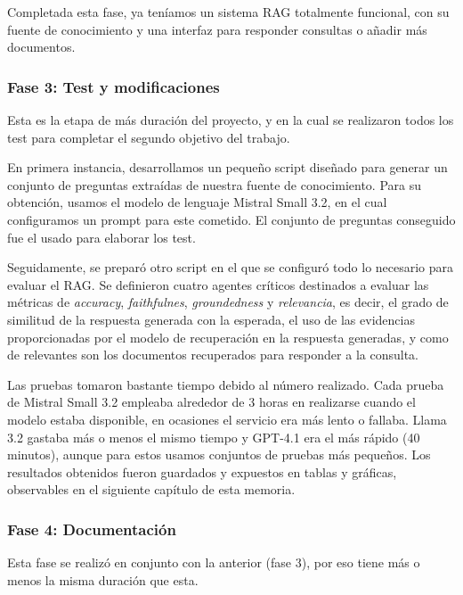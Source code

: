         		\noindent Completada esta fase, ya teníamos un sistema RAG totalmente funcional, con su fuente de conocimiento y una interfaz para responder consultas o añadir más documentos.
        		
        	\subsubsection{Fase 3: Test y modificaciones}
        	
        		Esta es la etapa de más duración del proyecto, y en la cual se realizaron todos los test para completar el segundo objetivo del trabajo.
        		
        		\noindent En primera instancia, desarrollamos un pequeño script diseñado para generar un conjunto de preguntas extraídas de nuestra fuente de conocimiento. Para su obtención, usamos el modelo de lenguaje Mistral Small 3.2, en el cual configuramos un prompt para este cometido. El conjunto de preguntas conseguido fue el usado para elaborar los test.
        		
        		\noindent Seguidamente, se preparó otro script en el que se configuró todo lo necesario para evaluar el RAG. Se definieron cuatro agentes críticos destinados a evaluar las métricas de \textit{accuracy}, \textit{faithfulnes}, \textit{groundedness} y \textit{relevancia}, es decir, el grado de similitud de la respuesta generada con la esperada, el uso de las evidencias proporcionadas por el modelo de recuperación en la respuesta generadas, y como de relevantes son los documentos recuperados para responder a la consulta.
        		
        		\noindent Las pruebas tomaron bastante tiempo debido al número realizado. Cada prueba de Mistral Small 3.2 empleaba alrededor de 3 horas en realizarse cuando el modelo estaba disponible, en ocasiones el servicio era más lento o fallaba. Llama 3.2 gastaba más o menos el mismo tiempo y GPT-4.1 era el más rápido (40 minutos), aunque para estos usamos conjuntos de pruebas más pequeños. Los resultados obtenidos fueron guardados y expuestos en tablas y gráficas, observables en el siguiente capítulo de esta memoria. 
        	
        	\subsubsection{Fase 4: Documentación}
        	
        		Esta fase se realizó en conjunto con la anterior (fase 3), por eso tiene más o menos la misma duración que esta. 
        		
